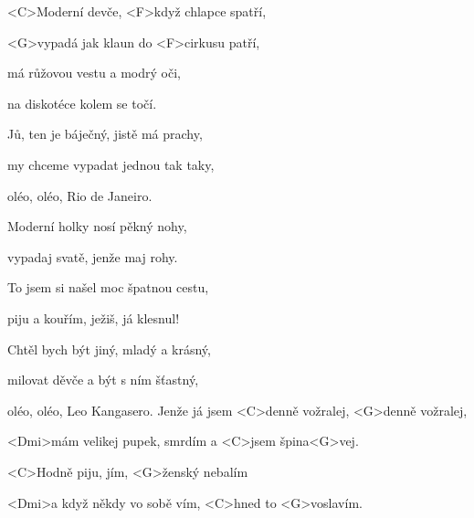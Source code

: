 
\zs
<C>Moderní devče, <F>když chlapce spatří,

<G>vypadá jak klaun do <F>cirkusu patří,

má růžovou vestu a modrý oči,

na diskotéce kolem se točí.

Jů, ten je báječný, jistě má prachy,

my chceme vypadat jednou tak taky,

oléo, oléo, Rio de Janeiro.
\ks

\zs
Moderní holky nosí pěkný nohy,

vypadaj svatě, jenže maj rohy.

To jsem si našel moc špatnou cestu,

piju a kouřím, ježiš, já klesnul!

Chtěl bych být jiný, mladý a krásný,

milovat děvče a být s ním šťastný,

oléo, oléo, Leo Kangasero.
\ks
\zr
Jenže já jsem <C>denně vožralej, <G>denně vožralej,

<Dmi>mám velikej pupek, smrdím a <C>jsem špina<G>vej.

<C>Hodně piju, jím, <G>ženský nebalím

<Dmi>a když někdy vo sobě vím, <C>hned to <G>voslavím.
\kr

\zr\kr
\kp
